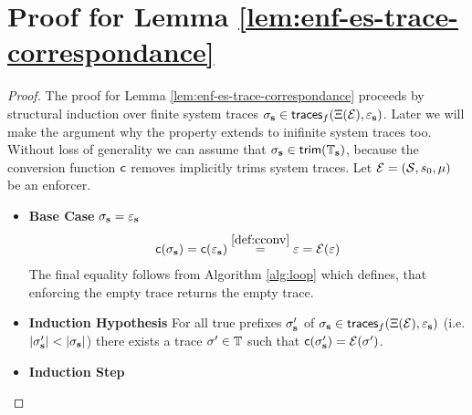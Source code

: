 \section{Proof for Lemma \ref{lem:enf-es-trace-correspondance}}
\label{appendix:section:proof-enf-es-trace-correspondance}

\begin{proof}
    \label{proof:enforcement-event-system-traces-corresponding-enforced-trace}
    The proof for Lemma
    \ref{lem:enf-es-trace-correspondance}
    proceeds by structural induction over finite system traces
    $\sigma_{\mathbf{s}} \in \mathsf{traces}_f(\Xi(\mathcal{E}), \varepsilon_{\mathbf{s}})$.
    Later we will make the argument why the property extends to inifinite
    system traces too.
    Without loss of generality we can assume that
    $\sigma_{\mathbf{s}} \in \mathsf{trim}(\mathbb{T}_{\mathbf{s}})$,
    because the conversion function $\mathsf{c}$ removes
    implicitly trims system traces.
    Let $\mathcal{E} = (\mathcal{S}, s_0, \mu)$ be an enforcer.
    \begin{itemize}
        \item
        \textbf{Base Case} $\sigma_{\mathbf{s}} = \varepsilon_{\mathbf{s}}$
        \begin{align*}
            \mathsf{c}(\sigma_{\mathbf{s}})
            = \mathsf{c}(\varepsilon_{\mathbf{s}}) 
            \stackrel{\ref{def:cconv}}{=} \varepsilon
            = \mathcal{E}(\varepsilon)
        \end{align*}
        The final equality follows from Algorithm \ref{alg:loop}
        which defines, that enforcing the empty trace returns
        the empty trace.        
        \item \textbf{Induction Hypothesis}
        For all true prefixes $\sigma_{\mathbf{s}}'$ of
        $\sigma_{\mathbf{s}} \in \mathsf{traces}_f(\Xi(\mathcal{E}), \varepsilon_{\mathbf{s}})$
        (i.e. $|\sigma_{\mathbf{s}}'| < |\sigma_{\mathbf{s}}|$)
        there exists a trace $\sigma' \in \mathbb{T}$ such that
        $\mathsf{c}(\sigma_{\mathbf{s}}') = \mathcal{E}(\sigma')$.

        \item \textbf{Induction Step}


\end{itemize}
\end{proof}

